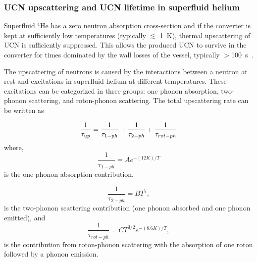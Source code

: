 

\subsubsection{UCN upscattering and UCN lifetime in superfluid helium~\label{sec:upscattering}}



Superfluid $^4$He has a zero neutron absorption cross-section and if
the converter is kept at sufficiently low temperatures (typically
$\lesssim$ 1~K), thermal upscattering of UCN is sufficiently
suppressed. This allows the produced UCN to survive in the converter
for times dominated by the wall losses of the vessel, typically
$>$100~s~\cite{Leung2016}.

The upscattering of neutrons is caused by the interactions between a
neutron at rest and excitations in superfluid helium at different
temperatures. These excitations can be categorized in three groups:
one phonon absorption, two-phonon scattering, and roton-phonon
scattering.  The total upscattering rate can be written as

\begin{equation}
\label{eqn:hE_{UCN}pscattering}
\frac{1}{\tau_{up}} =
\frac{1}{\tau_{1-ph}}+\frac{1}{\tau_{2-ph}}+\frac{1}{\tau_{rot-ph}}
\end{equation}
where,
\begin{equation}
\label{eqn:1ph}
\frac{1}{\tau_{1-ph}}= A e^{-(12 K)/T}
\end{equation}
is the one phonon absorption contribution, 

\begin{equation}
\label{eqn:2ph}
\frac{1}{\tau_{2-ph}}= BT^7,
\end{equation}
is the two-phonon scattering contribution (one phonon absorbed and one
phonon emitted), and
\begin{equation}
\label{eqn:ph-rtn}
\frac{1}{\tau_{rot-ph}}= CT^{3/2}e^{-(8.6 K)/T},
\end{equation}
is the contribution from roton-phonon scattering with the absorption
of one roton followed by a phonon emission.

